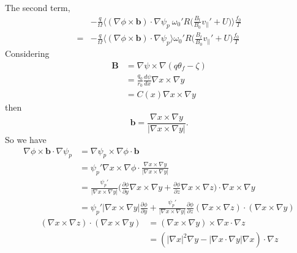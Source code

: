 \documentclass[12pt]{article}
\begin{document}
\begin{CJK*}{UTF8}{gbsn}
The second term,
\begin{equation}
\begin{split}
    &-\frac{q}{\Omega}\bigg\langle(\nabla\phi\times\mathbf{b})\cdot\nabla\psi_p\ \omega_0'R\bigg(\frac{B_t}{B_0}v_\parallel'+U\bigg)\bigg\rangle\frac{f_0}{T}\\
    =&-\frac{q}{\Omega}\bigg\langle(\nabla\phi\times\mathbf{b})\cdot\nabla\psi_p\bigg\rangle\omega_0'R\bigg(\frac{B_t}{B_0}v_\parallel'+U\bigg)\frac{f_0}{T}\label{t2}
\end{split}
\end{equation}
{\color{black}
Considering
\begin{equation}
\begin{split}
    \mathbf{B}&=\nabla\psi\times\nabla(q\theta_f-\zeta)\\
    &=\frac{q_0}{r_0}\frac{d\psi}{dx}\nabla x\times\nabla y\\
    &=C(x)\nabla x\times\nabla y
\end{split}
\end{equation}
then
\begin{equation}
    \mathbf{b}=\frac{\nabla x\times\nabla y}{|\nabla x\times\nabla y|}.
\end{equation}
So we have
\begin{equation}
    \begin{split}
        \nabla\phi\times\mathbf{b}\cdot\nabla\psi_p &= \nabla\psi_p\times\nabla\phi\cdot\mathbf{b}\\
        &=\psi_p'\nabla x\times\nabla\phi\cdot\frac{\nabla x\times\nabla y}{|\nabla x\times\nabla y|}\\
        &=\frac{\psi_p'}{|\nabla x\times\nabla y|}\bigg(\frac{\partial\phi}{\partial y}\nabla x\times\nabla y
        + \frac{\partial\phi}{\partial z}\nabla x\times\nabla z\bigg)\cdot\nabla x\times\nabla y\\
        &=\psi_p'|\nabla x\times\nabla y|\frac{\partial\phi}{\partial y} + \frac{\psi_p'}{|\nabla x\times\nabla y|}
        \frac{\partial\phi}{\partial z}(\nabla x\times\nabla z)\cdot(\nabla x\times\nabla y)\label{t1}
    \end{split}
\end{equation}
\begin{equation}
    \begin{split}
        (\nabla x\times\nabla z)\cdot(\nabla x\times\nabla y)&=(\nabla x\times\nabla y)\times\nabla x\cdot\nabla z\\
        &=(|\nabla x|^2\nabla y - |\nabla x\cdot\nabla y|\nabla x)\cdot\nabla z\\

\end{split}
\end{equation}}
\end{CJK*}
\end{document}
